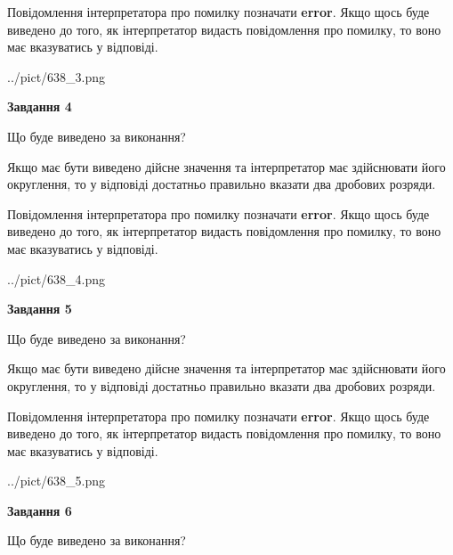 \documentclass[12pt, ukrainian]{article}
\begin{document}
{\begin {Large}
Повідомлення інтерпретатора про помилку позначати \textbf{error}.
Якщо щось буде виведено до того, як інтерпретатор видасть повідомлення про помилку, 
то воно має вказуватись у відповіді. \par

\begin{center}
	{../pict/638_3.png}
\end{center}
\newpage

{\begin {center}\textbf{Завдання 4}\end {center}}\par
Що буде виведено за виконання? \par

Якщо має бути виведено дійсне значення та інтерпретатор має здійснювати його округлення, 
то у відповіді достатньо правильно вказати два дробових розряди.

Повідомлення інтерпретатора про помилку позначати \textbf{error}.
Якщо щось буде виведено до того, як інтерпретатор видасть повідомлення про помилку, 
то воно має вказуватись у відповіді. \par

\begin{center}
	{../pict/638_4.png}
\end{center}
\newpage

{\begin {center}\textbf{Завдання 5}\end {center}}\par
Що буде виведено за виконання? \par

Якщо має бути виведено дійсне значення та інтерпретатор має здійснювати його округлення, 
то у відповіді достатньо правильно вказати два дробових розряди.

Повідомлення інтерпретатора про помилку позначати \textbf{error}.
Якщо щось буде виведено до того, як інтерпретатор видасть повідомлення про помилку, 
то воно має вказуватись у відповіді. \par

\begin{center}
	{../pict/638_5.png}
\end{center}
\newpage

{\begin {center}\textbf{Завдання 6}\end {center}}\par
Що буде виведено за виконання? \par


\end{Large}}
\end{document}
